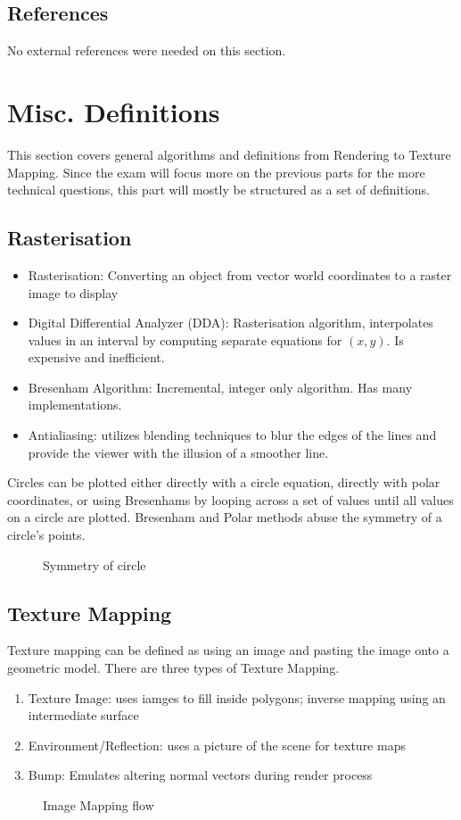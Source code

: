 \subsection{References}
No external references were needed on this section.
\newpage
\section{Misc. Definitions}
This section covers general algorithms and definitions from Rendering to Texture Mapping. Since the exam will focus more on the previous parts for the more technical questions, this part will mostly be structured as a set of definitions.

\subsection{Rasterisation}
\begin{itemize}
	\item Rasterisation: Converting an object from vector world coordinates to a raster image to display
	\item Digital Differential Analyzer (DDA): Rasterisation algorithm, interpolates values in an interval by computing separate equations for $(x,y)$. Is expensive and inefficient.
	\item Bresenham Algorithm: Incremental, integer only algorithm. Has many implementations.
	\item Antialiasing: utilizes blending techniques to blur the edges of the lines and provide the viewer with the illusion of a smoother line. 
\end{itemize}
Circles can be plotted either directly with a circle equation, directly with polar coordinates, or using Bresenhams by looping across a set of values until all values on a circle are plotted. Bresenham and Polar methods abuse the symmetry of a circle's points.
\begin{figure}[!htb]
	\caption{\label{fig:circleRaster} Symmetry of circle}
\end{figure}
\subsection{Texture Mapping}
Texture mapping can be defined as using an image and pasting the image onto a geometric model. There are three types of Texture Mapping.
\begin{enumerate}
	\item Texture Image: uses iamges to fill inside polygons; inverse mapping using an intermediate surface
	\item Environment/Reflection: uses a picture of the scene for texture maps
	\item Bump: Emulates altering normal vectors during render process
\end{enumerate}
\begin{figure}[!htb]
	\caption{\label{fig:imageMap} Image Mapping flow}
\end{figure}

